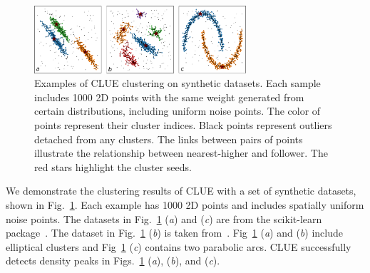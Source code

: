 \begin{figure}[ht]
    \centering
    \includegraphics[clip, width=0.7\textwidth]{chapters/HGCal/figures/clue/Figure3_cut_boh.pdf}
    \caption{ 
    Examples of CLUE clustering on synthetic datasets. Each sample includes 1000 2D points with the same weight generated from certain distributions, including uniform noise points. The color of points represent their cluster indices. Black points represent outliers detached from any clusters. The links between pairs of points illustrate the relationship between nearest-higher and follower. The red stars highlight the cluster seeds.
    }
    \label{fig:performance:example}
\end{figure}

We demonstrate the clustering results of CLUE with a set of synthetic datasets, shown in Fig.~\ref{fig:performance:example}. Each example has 1000 2D points and includes spatially uniform noise points. The datasets in Fig.~\ref{fig:performance:example} (\emph{a}) and (\emph{c})  are from the scikit-learn package~\cite{scikit-learn}. The dataset in Fig.~\ref{fig:performance:example} (\emph{b}) is taken from~\cite{rodriguez2014clustering}. Fig~\ref{fig:performance:example} (\emph{a}) and (\emph{b}) include elliptical clusters and Fig~\ref{fig:performance:example} (\emph{c}) contains two parabolic arcs. CLUE successfully detects
density peaks in Figs.~\ref{fig:performance:example} (\emph{a}), (\emph{b}), and (\emph{c}).

